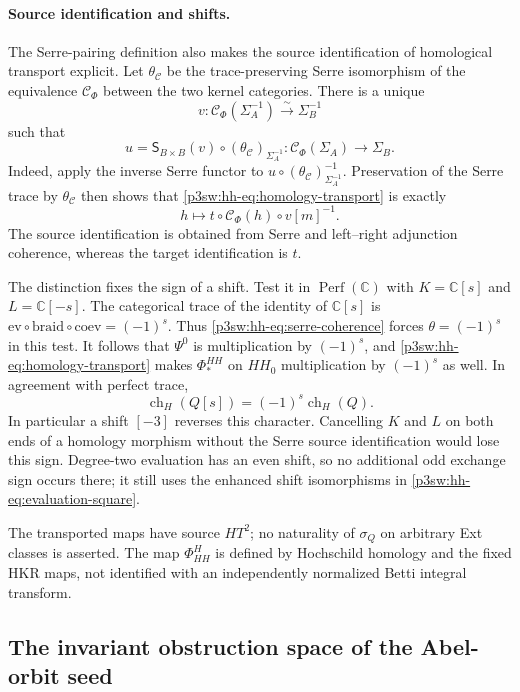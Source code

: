 \documentclass[11pt]{article}
\numberwithin{equation}{section}
\begin{document}
\paragraph{Source identification and shifts.}
The Serre-pairing definition also makes the source identification
of homological transport explicit.  Let \(\theta_{\mathcal C}\) be the
trace-preserving Serre isomorphism of the equivalence \(\mathcal C_\Phi\) between the two
kernel categories.  There is a unique
\[
 v:\mathcal C_\Phi(\Sigma_A^{-1})
                \xrightarrow{\sim}\Sigma_B^{-1}
\]
such that
\[
 u=\mathsf S_{B\times B}(v)\circ
             (\theta_{\mathcal C})_{\Sigma_A^{-1}}:
      \mathcal C_\Phi(\Sigma_A)\longrightarrow\Sigma_B.
\]
Indeed, apply the inverse Serre functor to
\(u\circ(\theta_{\mathcal C})_{\Sigma_A^{-1}}^{-1}\).
Preservation of the Serre trace by \(\theta_{\mathcal C}\) then
shows that \eqref{p3sw:hh-eq:homology-transport} is exactly
\[
 h\longmapsto t\circ\mathcal C_\Phi(h)\circ v[m]^{-1}.
\]
The source identification is obtained from Serre and left--right
adjunction coherence, whereas the target identification is \(t\).

The distinction fixes the sign of a shift.  Test it in
\(\operatorname{Perf}(\mathbb C)\) with \(K=\mathbb C[s]\) and
\(L=\mathbb C[-s]\).  The categorical trace of the identity of
\(\mathbb C[s]\) is
\(\mathrm{ev}\circ\mathrm{braid}\circ\mathrm{coev}=(-1)^s\).
Thus \eqref{p3sw:hh-eq:serre-coherence} forces
\(\theta=(-1)^s\) in this test.  It follows that \(\Psi^0\) is
multiplication by \((-1)^s\), and
\eqref{p3sw:hh-eq:homology-transport} makes
\(\Phi_*^{HH}\) on \(HH_0\) multiplication by \((-1)^s\) as well.
In agreement with perfect trace,
\[
 \operatorname{ch}_H(Q[s])=(-1)^s\operatorname{ch}_H(Q).
\]
In particular a shift \([-3]\) reverses this character.  Cancelling
\(K\) and \(L\) on both ends of a homology morphism without the Serre
source identification would lose this sign.  Degree-two evaluation
has an even shift, so no additional odd exchange sign occurs there;
it still uses the enhanced shift isomorphisms in
\eqref{p3sw:hh-eq:evaluation-square}.

The transported maps have source \(HT^2\); no naturality of
\(\sigma_Q\) on arbitrary Ext classes is asserted.
The map \(\Phi^H_{HH}\) is defined by Hochschild homology and the fixed
HKR maps, not identified with an independently normalized Betti integral
transform.
\subsection{The invariant obstruction space of the Abel-orbit seed}
\label{p3sw:invariant-section}
\end{document}

